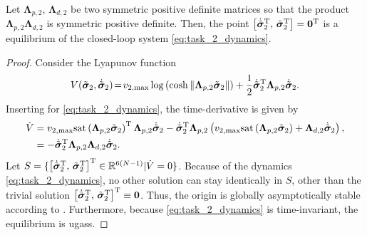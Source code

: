 \begin{theorem}
Let $\mathbf{\Lambda}_{p,2}, \, \mathbf{\Lambda}_{d,2}$ be two symmetric positive definite matrices so that the product $\mathbf{\Lambda}_{p,2} \mathbf{\Lambda}_{d,2}$ is symmetric positive definite. Then, the point $\bigl[\dot{\Tilde{\bm{\sigma}}}_2^{\mathrm{T}},\, \Tilde{\bm{\sigma}}_2^{\mathrm{T}}\bigr] = \mathbf{0}^{\mathrm{T}}$ is a  equilibrium of the closed-loop system \eqref{eq:task_2_dynamics}.
\end{theorem}

\begin{proof}
    Consider the Lyapunov function
    \begin{equation}
  V(\Tilde{\bm{\sigma}}_2, \dot{\Tilde{\bm{\sigma}}}_2) \!=\! v_{2,\max}\log\left(\cosh{\|\mathbf{\Lambda}_{p,2}\Tilde{\bm{\sigma}}_{2}\|}\right) + \frac{1}{2}\dot{\Tilde{\bm{\sigma}}}_2^{\mathrm{T}}\mathbf{\Lambda}_{p,2}\dot{\Tilde{\bm{\sigma}}}_2.
\end{equation}
Inserting for \eqref{eq:task_2_dynamics}, the time-derivative is given by
\begin{align}
    \dot{V} &= v_{2,\max}\mathrm{sat}\left(\mathbf{\Lambda}_{p,2}\Tilde{\bm{\sigma}}_{2}\right)^{\mathrm{T}} \mathbf{\Lambda}_{p,2} \dot{\Tilde{\bm{\sigma}}}_2 
                -\dot{\Tilde{\bm{\sigma}}}_2^{\mathrm{T}} \mathbf{\Lambda}_{p,2}\left(v_{2,\max}\mathrm{sat}\left(\mathbf{\Lambda}_{p,2}\Tilde{\bm{\sigma}}_{2}\right) + \mathbf{\Lambda}_{d,2}\dot{\Tilde{\bm{\sigma}}}_2\right), \nonumber \\
    &= -\dot{\Tilde{\bm{\sigma}}}_2^{\mathrm{T}}\mathbf{\Lambda}_{p,2} \mathbf{\Lambda}_{d,2}\dot{\Tilde{\bm{\sigma}}}_2.
\end{align}
Let $S = \{\bigl[\dot{\Tilde{\bm{\sigma}}}_2^{\mathrm{T}},\, \Tilde{\bm{\sigma}}_2^{\mathrm{T}}\bigr]^{\mathrm{T}} \in \mathbb{R}^{6(N-1)} | \dot{V} = 0\}$. Because of the dynamics \eqref{eq:task_2_dynamics}, no other solution can stay identically in $S$, other than the trivial solution $\bigl[\dot{\Tilde{\bm{\sigma}}}_2^{\mathrm{T}},\, \Tilde{\bm{\sigma}}_2^{\mathrm{T}}\bigr]^{\mathrm{T}} \equiv \mathbf{0}$. Thus, the origin is globally asymptotically stable according to \cite[Corollary 4.2]{khalil_nonlinear_2002}. Furthermore, because \eqref{eq:task_2_dynamics} is time-invariant, the equilibrium is \glspl{ugas}.
\end{proof}


